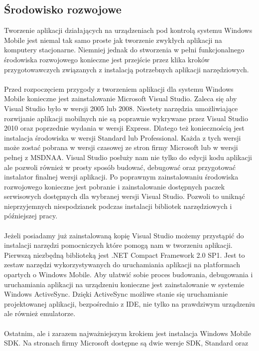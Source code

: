 \subsection{Środowisko rozwojowe}
Tworzenie aplikacji działających na urządzeniach pod kontrolą systemu Windows
Mobile jest niemal tak samo proste jak tworzenie zwykłych aplikacji na komputery
stacjonarne. Niemniej jednak do stworzenia w pełni funkcjonalnego środowiska
rozwojowego konieczne jest przejście przez klika kroków przygotowawczych
związanych z instalacją potrzebnych aplikacji narzędziowych. \\
\\
Przed rozpoczęciem przygody z tworzeniem aplikacji dla systemu Windows Mobile
konieczne jest zainstalowanie Microsoft Visual Studio. Zaleca się aby Visual
Studio było w wersji 2005 lub 2008. Niestety narzędzia umożliwiające rozwijanie
aplikacji mobilnych nie są poprawnie wykrywane przez Visual Studio 2010 oraz
poprzednie wydania w wersji Express. Dlatego też koniecznością jest instalacja
środowiska w wersji Standard lub Professional. Każda z tych wersji może zostać
pobrana w wersji czasowej ze stron firmy Microsoft lub w wersji pełnej z MSDNAA.
Visual Studio posłuży nam nie tylko do edycji kodu aplikacji ale pozwoli również
w prosty sposób budować, debugować oraz przygotować instalator finalnej wersji
aplikacji. Po poprawnym zainstalowaniu środowiska rozwojowego konieczne jest
pobranie i zainstalowanie dostępnych paczek serwisowych dostępnych dla wybranej
wersji Visual Studio. Pozwoli to uniknąć nieprzyjemnych niespodzianek podczas
instalacji bibliotek narzędziowych i późniejszej pracy.\\
\\
Jeżeli posiadamy już zainstalowaną kopię Visual Studio możemy przystąpić do
instalacji narzędzi pomocniczych które pomogą nam w tworzeniu aplikacji.
Pierwszą niezbędną biblioteką jest .NET Compact Framework 2.0 SP1. Jest to
zestaw narzędzi wykorzystywanych do uruchamiania aplikacji na platformach
opartych o Windows Mobile. Aby ułatwić sobie proces budowania, debugowania i
uruchamiania aplikacji na urządzeniu konieczne jest zainstalowanie w systemie
Windows ActiveSync. Dzięki ActiveSync możliwe stanie się uruchamianie
projektowanej aplikacji, bezpośrednio z IDE, nie tylko na prawdziwym urządzeniu
ale również emulatorze. \\
\\
Ostatnim, ale i zarazem najważniejszym krokiem jest instalacja Windows Mobile
SDK. Na stronach firmy Microsoft dostępne są dwie wersje SDK, Standard oraz

